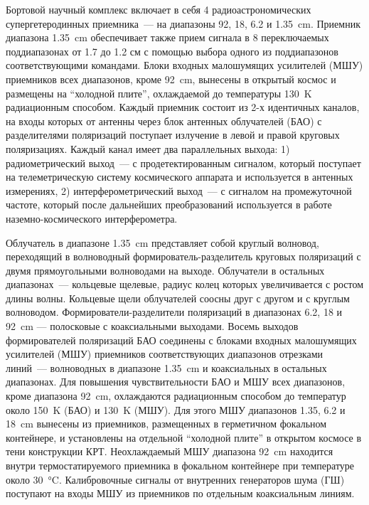Бортовой научный комплекс включает в себя 4 радиоастрономических супергетеродинных приемника~--- на
диапазоны 92, 18, 6.2 и \SI{1.35}{\cm}. Приемник диапазона \SI{1.35}{\cm} обеспечивает также прием
сигнала в 8 переключаемых поддиапазонах от 1.7 до 1.2 см с помощью выбора одного из поддиапазонов
соответствующими командами. Блоки входных малошумящих усилителей (МШУ) приемников всех диапазонов,
кроме \SI{92}{\cm}, вынесены в открытый космос и размещены на ``холодной плите'', охлаждаемой до
температуры \SI{130}{\kelvin} радиационным способом. Каждый приемник состоит из 2-х идентичных
каналов, на входы которых от антенны через блок антенных облучателей (БАО) с разделителями
поляризаций поступает излучение в левой и правой круговых поляризациях. Каждый канал имеет два
параллельных выхода: 1) радиометрический выход~--- с продетектированным сигналом, который поступает
на телеметрическую систему космического аппарата и используется в антенных измерениях, 2)
интерферометрический выход~--- с сигналом на промежуточной частоте, который после дальнейших
преобразований используется в работе наземно-космического интерферометра.

Облучатель в диапазоне \SI{1.35}{\cm} представляет собой круглый волновод, переходящий в волноводный
формирователь-разделитель круговых поляризаций с двумя прямоугольными волноводами на выходе.
Облучатели в остальных диапазонах~--- кольцевые щелевые, радиус колец которых увеличивается с ростом
длины волны. Кольцевые щели облучателей соосны друг с другом и с круглым волноводом.
Формирователи-разделители поляризаций в диапазонах 6.2, 18 и \SI{92}{\cm} --- полосковые с
коаксиальными выходами. Восемь выходов формирователей поляризаций БАО соединены с блоками входных
малошумящих усилителей (МШУ) приемников соответствующих диапазонов отрезками линий~--- волноводных в
диапазоне \SI{1.35}{\cm} и коаксиальных в остальных диапазонах. Для повышения чувствительности БАО и
МШУ всех диапазонов, кроме диапазона \SI{92}{\cm}, охлаждаются радиационным способом до температур
около \SI{150}{\kelvin} (БАО) и \SI{130}{\kelvin} (МШУ). Для этого МШУ диапазонов 1.35, 6.2 и
\SI{18}{\cm} вынесены из приемников, размещенных в герметичном фокальном контейнере, и установлены
на отдельной ``холодной плите'' в открытом космосе в тени конструкции КРТ. Неохлаждаемый МШУ
диапазона \SI{92}{\cm} находится внутри термостатируемого приемника в фокальном контейнере при
температуре около \SI{30}{\degreeCelsius}. Калибровочные сигналы от внутренних генераторов шума (ГШ)
поступают на входы МШУ из приемников по отдельным коаксиальным линиям.

